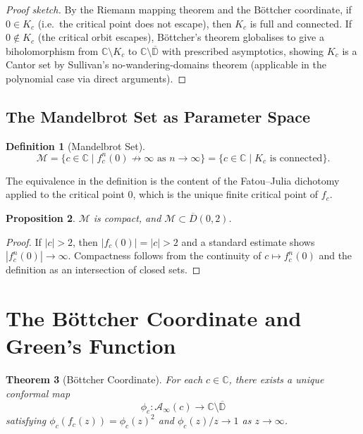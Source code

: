 \documentclass[12pt,a4paper]{amsart}
\newtheorem{theorem}{Theorem}[section]
\newtheorem{proposition}[theorem]{Proposition}
\theoremstyle{definition}
\newtheorem{definition}[theorem]{Definition}
\theoremstyle{remark}
\begin{document}
\begin{proof}[Proof sketch]
By the Riemann mapping theorem and the Böttcher coordinate, if $0 \in K_c$
(i.e.\ the critical point does not escape), then $K_c$ is full and connected.
If $0 \notin K_c$ (the critical orbit escapes), Böttcher's theorem
globalises to give a biholomorphism from $\mathbb{C} \setminus K_c$ to
$\mathbb{C} \setminus \overline{\mathbb{D}}$ with prescribed asymptotics,
showing $K_c$ is a Cantor set by Sullivan's no-wandering-domains theorem
(applicable in the polynomial case via direct arguments).
\end{proof}

\subsection{The Mandelbrot Set as Parameter Space}

\begin{definition}[Mandelbrot Set]
\[
    \mathcal{M} = \{ c \in \mathbb{C} \mid f_c^n(0) \not\to \infty \text{ as } n \to \infty \}
              = \{ c \in \mathbb{C} \mid K_c \text{ is connected} \}.
\]
\end{definition}

The equivalence in the definition is the content of the Fatou--Julia
dichotomy applied to the critical point $0$, which is the unique finite
critical point of $f_c$.

\begin{proposition}
$\mathcal{M}$ is compact, and $\mathcal{M} \subset \overline{D}(0, 2)$.
\end{proposition}

\begin{proof}
If $|c| > 2$, then $|f_c(0)| = |c| > 2$ and a standard estimate shows
$|f_c^n(0)| \to \infty$. Compactness follows from the continuity of
$c \mapsto f_c^n(0)$ and the definition as an intersection of closed sets.
\end{proof}

\section{The Böttcher Coordinate and Green's Function}

\begin{theorem}[Böttcher Coordinate]
For each $c \in \mathbb{C}$, there exists a unique conformal map
\[
    \phi_c \colon \mathcal{A}_\infty(c) \to \mathbb{C} \setminus \overline{\mathbb{D}}
\]
satisfying $\phi_c(f_c(z)) = \phi_c(z)^2$ and $\phi_c(z)/z \to 1$ as $z \to \infty$.
\end{theorem}
\end{document}
